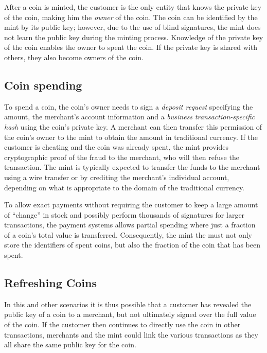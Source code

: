 \documentclass{llncs}
\begin{document}
After a coin is minted, the customer is the only entity that knows the
private key of the coin, making him the \emph{owner} of the coin.  
The coin can be identified by the mint by its public key; however, due
to the use of blind signatures, the mint does not learn the public key
during the minting process.  Knowledge of the private key of the coin
enables the owner to spent the coin.  If the private key is shared
with others, they also become owners of the coin.

\subsection{Coin spending}

To spend a coin, the coin's owner needs to sign a {\em deposit
  request} specifying the amount, the merchant's account information
and a {\em business transaction-specific hash} using the coin's
private key.  A merchant can then transfer this permission of the
coin's owner to the mint to obtain the amount in traditional currency.
If the customer is cheating and the coin was already spent, the mint
provides cryptographic proof of the fraud to the merchant, who will
then refuse the transaction.  The mint is typically expected to
transfer the funds to the merchant using a wire transfer or by
crediting the merchant's individual account, depending on what is
appropriate to the domain of the traditional currency.

To allow exact payments without requiring the customer to keep a large
amount of ``change'' in stock and possibly perform thousands of
signatures for larger transactions, the payment systems allows partial
spending where just a fraction of a coin's total value is transferred.
Consequently, the mint the must not only store the identifiers of
spent coins, but also the fraction of the coin that has been spent.


\subsection{Refreshing Coins}

In this and other scenarios it is thus possible that a customer has
revealed the public key of a coin to a merchant, but not ultimately
signed over the full value of the coin.  If the customer then
continues to directly use the coin in other transactions, merchants
and the mint could link the various transactions as they all share the
same public key for the coin.
\end{document}
